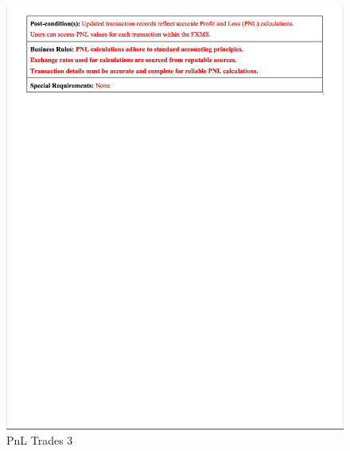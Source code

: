 \documentclass[a4paper]{report}
\begin{document}
\begin{figure}[h!]
    \centering
    \includegraphics[width=\textwidth]{images/uc/10.3-pnl-trades.png}
    \caption{PnL Trades 3}
    \label{fig:10.3-pnl-trades}
\end{figure}
\end{document}

